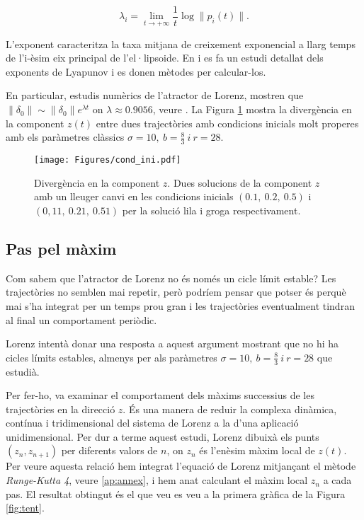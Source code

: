 \documentclass[11pt,a4paper,openright,oneside]{article}
\numberwithin{equation}{section}
\theoremstyle{definition}
\begin{document}
\begin{equation*}
    \lambda_i=\lim_{t\to+\infty}\frac{1}{t}\log\|p_i(t)\|.
\end{equation*}

L'exponent caracteritza la taxa mitjana de creixement exponencial a llarg temps de l'i-èsim eix principal de l'el·lipsoide. En \cite{Wolf} i \cite{Ruelle} es fa un estudi detallat dels exponents de Lyapunov i es donen mètodes per calcular-los.

En particular, estudis numèrics de l'atractor de Lorenz, mostren que $\|\delta_0\|\sim \|\delta_0\|e^{\lambda t}$ on $\lambda \approx 0.9056$, veure \cite{dim_exp}. La Figura \ref{fig:cond_ini} mostra la divergència en la component $z(t)$ entre dues trajectòries amb condicions inicials molt properes amb els paràmetres clàssics $\sigma=10, \ b=\frac{8}{3} \ i \ r=28$.

\begin{figure}[htpb]
    \centering
    \texttt{[image: Figures/cond\_ini.pdf]}
    \caption{Divergència en la component $z$. Dues solucions de la component $z$ amb un lleuger canvi en les condicions inicials $(0.1, \ 0.2, \ 0.5)$ i $(0,11, \ 0.21, \ 0.51)$ per la solució lila i groga respectivament.}
    \label{fig:cond_ini}
\end{figure}

\subsection*{Pas pel màxim}

Com sabem que l'atractor de Lorenz no és només un cicle límit estable? Les trajectòries no semblen mai repetir, però podríem pensar que potser és perquè mai s'ha integrat per un temps prou gran i les trajectòries eventualment tindran al final un comportament periòdic.

Lorenz intentà donar una resposta \cite{Lorenz} a aquest argument mostrant que no hi ha cicles límits estables, almenys per als paràmetres $\sigma=10, \ b=\frac{8}{3} \ i \ r=28$ que estudià.

Per fer-ho, va examinar el comportament dels màxims successius de les trajectòries en la direcció $z$. És una manera de reduir la complexa dinàmica, contínua i tridimensional del sistema de Lorenz a la d'una aplicació unidimensional. Per dur a terme aquest estudi, Lorenz dibuixà els punts $(z_n, z_{n+1})$ per diferents valors de $n$, on $z_n$ és l'enèsim màxim local de $z(t)$. Per veure aquesta relació hem integrat l'equació de Lorenz mitjançant el mètode \textit{Runge-Kutta 4}, veure \ref{ap:annex}, i hem anat calculant el màxim local $z_n$ a cada pas. El resultat obtingut és el que veu es veu a la primera gràfica de la Figura \ref{fig:tent}.
\end{document}
